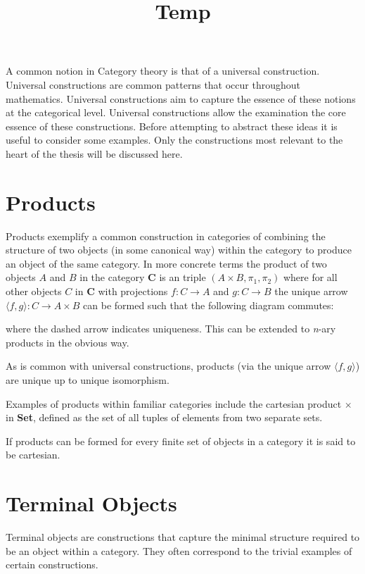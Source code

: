 \documentclass[a4paper,10pt]{article}
\date{}
\title{Temp}
\begin{document}
\maketitle
A common notion in Category theory is that of a universal construction.
Universal constructions are common patterns that occur throughout mathematics.
Universal constructions aim to capture the essence of these notions at the
categorical level. Universal constructions allow the examination the core
essence of these constructions. Before attempting to abstract these ideas it is
useful to consider some examples. Only the constructions most relevant to the
heart of the thesis will be discussed here.

\section{Products}
Products exemplify a common construction in categories of combining the
structure of two objects (in some canonical way) within the category to produce
an object of the same category. In more concrete terms the product of two
objects $A$ and $B$ in the category $\textbf{C}$ is an triple $(A \times B,
\pi_{1}, \pi_{2})$ where for all other objects $C$ in $\textbf{C}$ with
projections $f: C \rightarrow A$ and $g: C \rightarrow B$ the unique arrow
$\langle f, g\rangle : C \rightarrow A \times B$ can be formed such that the
following diagram commutes:


where the dashed arrow indicates uniqueness. This can be extended to
\textit{n}-ary products in the obvious way.

As is common with universal constructions, products (via the unique arrow
$\langle f, g \rangle$) are unique up to unique isomorphism.

Examples of products within familiar categories include the cartesian product
$\times$ in \textbf{Set}, defined as the set of all tuples of elements from two
separate sets.

If products can be formed for every finite set of objects in a category it is
said to be cartesian.

\section{Terminal Objects}
Terminal objects are constructions that capture the
minimal structure required to be an object within a category. They often
correspond to the trivial examples of certain constructions.
\end{document}
